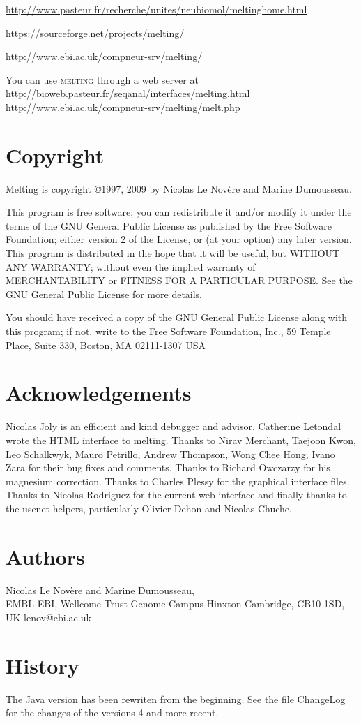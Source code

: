 \documentclass{article}
\begin{document}
\url{http://www.pasteur.fr/recherche/unites/neubiomol/meltinghome.html} 

\url{https://sourceforge.net/projects/melting/}

\url{http://www.ebi.ac.uk/compneur-srv/melting/}
  
You can use \textsc{melting} through a web server at 
\url{http://bioweb.pasteur.fr/seqanal/interfaces/melting.html}
\url{http://www.ebi.ac.uk/compneur-srv/melting/melt.php}   
   
\section{Copyright }
Melting is copyright 
\copyright 1997, 2009 by Nicolas Le Nov\`ere and Marine Dumousseau.  

This program is free software; 
you can redistribute it and/or modify it under the terms of the GNU General 
Public License as published by the Free Software Foundation; either version 
2 of the License, or (at your option) any later version.   
  This program 
is distributed in the hope that it will be useful, but WITHOUT ANY WARRANTY; 
without even the implied warranty of MERCHANTABILITY or FITNESS FOR A 
PARTICULAR PURPOSE.  See the GNU General Public License for more details. 
  
  You should have received a copy of the GNU General Public License 
along with this program; if not, write to the Free Software Foundation, 
Inc., 59 Temple Place, Suite 330, Boston, MA  02111-1307 USA   
   
\section{Acknowledgements}
Nicolas Joly is an efficient and kind debugger and advisor. Catherine
Letondal wrote the HTML interface to melting. Thanks to Nirav Merchant,
Taejoon Kwon, Leo Schalkwyk, Mauro Petrillo, Andrew Thompson, Wong Chee Hong, Ivano
Zara for their bug fixes and comments. Thanks to Richard Owczarzy for his magnesium 
correction. Thanks to Charles Plessy for the graphical interface files. Thanks to Nicolas Rodriguez for the current web interface and finally thanks
to the usenet helpers, particularly Olivier Dehon and Nicolas Chuche.

   
\section{Authors }
Nicolas Le Nov\`ere and Marine Dumousseau, \\
EMBL-EBI, 
Wellcome-Trust Genome Campus
Hinxton Cambridge, CB10 1SD, UK
lenov@ebi.ac.uk
  
\section{History }

The Java version has been rewriten from the beginning.
See the file ChangeLog for the changes of the versions 4 and more recent.
\end{document}
